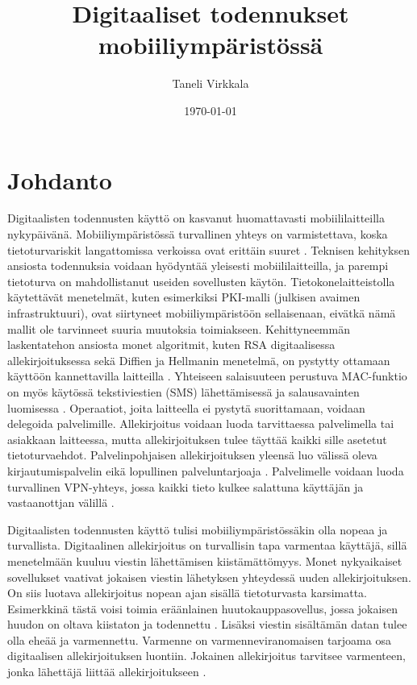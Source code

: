\documentclass[finnish]{tktltiki2}
\title{Digitaaliset todennukset mobiiliympäristössä}
\author{Taneli Virkkala}
\date{\today}
\theoremstyle{definition}
\theoremstyle{remark}
\begin{document}

\frontmatter      %

\maketitle        %
\makeabstract     %

\tableofcontents  %


\mainmatter       %

\section{Johdanto}



Digitaalisten todennusten käyttö on kasvanut huomattavasti mobiililaitteilla nykypäivänä. Mobiiliympäristössä turvallinen yhteys on varmistettava, koska tietoturvariskit langattomissa verkoissa ovat erittäin suuret \cite{enti}. Teknisen kehityksen ansiosta todennuksia voidaan hyödyntää yleisesti mobiililaitteilla, ja parempi tietoturva on mahdollistanut useiden sovellusten käytön. Tietokonelaitteistolla käytettävät menetelmät, kuten esimerkiksi PKI-malli (julkisen avaimen infrastruktuuri), ovat siirtyneet mobiiliympäristöön sellaisenaan, eivätkä nämä mallit ole tarvinneet suuria muutoksia toimiakseen. Kehittyneemmän laskentatehon ansiosta monet algoritmit, kuten RSA digitaalisessa allekirjoituksessa sekä Diffien ja Hellmanin menetelmä, on pystytty ottamaan käyttöön kannettavilla laitteilla \cite{enti}. Yhteiseen salaisuuteen perustuva MAC-funktio on myös käytössä tekstiviestien (SMS) lähettämisessä \cite{MAC} ja salausavainten luomisessa \cite{MACA}. Operaatiot, joita laitteella ei pystytä suorittamaan, voidaan delegoida palvelimille. Allekirjoitus voidaan luoda tarvittaessa palvelimella tai asiakkaan laitteessa, mutta allekirjoituksen tulee täyttää kaikki sille asetetut tietoturvaehdot. Palvelinpohjaisen allekirjoituksen yleensä luo välissä oleva kirjautumispalvelin eikä lopullinen palveluntarjoaja \cite{proxy}. Palvelimelle voidaan luoda turvallinen VPN-yhteys, jossa kaikki tieto kulkee salattuna käyttäjän ja vastaanottjan välillä \cite{vpn}.

Digitaalisten todennusten käyttö tulisi mobiiliympäristössäkin  olla nopeaa ja turvallista. Digitaalinen allekirjoitus on turvallisin tapa varmentaa käyttäjä, sillä menetelmään kuuluu viestin lähettämisen kiistämättömyys. Monet nykyaikaiset sovellukset vaativat jokaisen viestin lähetyksen yhteydessä uuden allekirjoituksen. On siis luotava allekirjoitus nopean ajan sisällä tietoturvasta karsimatta. Esimerkkinä tästä voisi toimia eräänlainen huutokauppasovellus, jossa jokaisen huudon on oltava kiistaton ja todennettu \cite{proxy}. Lisäksi viestin sisältämän datan tulee olla eheää ja varmennettu. Varmenne on varmenneviranomaisen tarjoama osa digitaalisen allekirjoituksen luontiin. Jokainen allekirjoitus tarvitsee varmenteen, jonka lähettäjä liittää allekirjoitukseen \cite{ECC}.   
\end{document}
